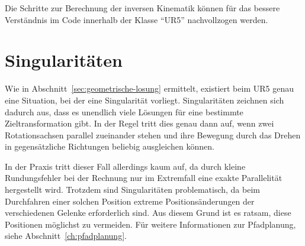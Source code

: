 Die Schritte zur Berechnung der inversen Kinematik können für das bessere Verständnis im Code innerhalb der Klasse \enquote{UR5} nachvollzogen werden.


\section{Singularitäten}\label{sec:singularitaten}

Wie in Abschnitt~\ref{sec:geometrische-losung} ermittelt, existiert beim UR5 genau eine Situation, bei der eine Singularität vorliegt.
Singularitäten zeichnen sich dadurch aus, dass es unendlich viele Lösungen für eine bestimmte Zieltransformation gibt.
In der Regel tritt dies genau dann auf, wenn zwei Rotationsachsen parallel zueinander stehen und ihre Bewegung durch das Drehen in gegensätzliche Richtungen beliebig ausgleichen können.

In der Praxis tritt dieser Fall allerdings kaum auf, da durch kleine Rundungsfehler bei der Rechnung nur im Extremfall eine exakte Parallelität hergestellt wird.
Trotzdem sind Singularitäten problematisch, da beim Durchfahren einer solchen Position extreme Positionsänderungen der verschiedenen Gelenke erforderlich sind.
Aus diesem Grund ist es ratsam, diese Positionen möglichst zu vermeiden.
Für weitere Informationen zur Pfadplanung, siehe Abschnitt~\ref{ch:pfadplanung}.
